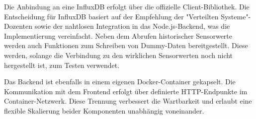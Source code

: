 Die Anbindung an eine InfluxDB erfolgt über die offizielle Client-Bibliothek. Die Entscheidung für InfluxDB basiert auf der Empfehlung der "Verteilten Systeme"-Dozenten sowie der nahtlosen Integration in das Node.js-Backend, was die Implementierung vereinfacht.
Neben dem Abrufen historischer Sensorwerte werden auch Funktionen zum Schreiben von Dummy-Daten bereitgestellt.
Diese werden, solange die Verbindung zu den wirklichen Sensorwerten noch nicht hergestellt ist, zum Testen verwendet.

Das Backend ist ebenfalls in einem eigenen Docker-Container gekapselt. 
Die Kommunikation mit dem Frontend erfolgt über definierte HTTP-Endpunkte im Container-Netzwerk. 
Diese Trennung verbessert die Wartbarkeit und erlaubt eine flexible Skalierung beider Komponenten unabhängig voneinander.
